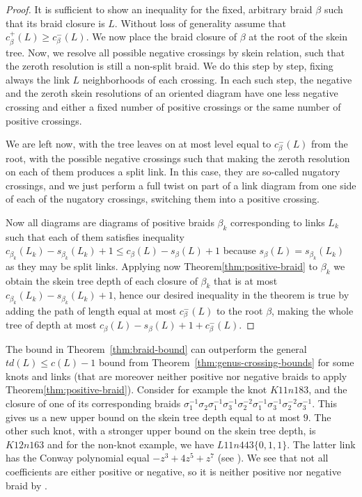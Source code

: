 \documentclass[pdftex, a4paper, 12pt, oneside]{amsart}
\numberwithin{equation}{section}
\theoremstyle{plain}
\theoremstyle{definition}
\begin{document}
	\begin{proof}
It is sufficient to show an inequality for the fixed, arbitrary braid $\beta$ such that its braid closure is $L$. Without loss of generality assume that $c_{\beta}^+(L) \geq c_{\beta}^-(L)$. We now place the braid closure of $\beta$ at the root of the skein tree. Now, we resolve all possible negative crossings by skein relation, such that the zeroth resolution is still a non-split braid. We do this step by step, fixing always the link $L$ neighborhoods of each crossing. In each such step, the negative and the zeroth skein resolutions of an oriented diagram have one less negative crossing and either a fixed number of positive crossings or the same number of positive crossings.
\par
We are left now, with the tree leaves on at most level equal to $c_{\beta}^-(L)$ from the root, with the possible negative crossings such that making the zeroth resolution on each of them produces a split link. In this case, they are so-called nugatory crossings, and we just perform a full twist on part of a link diagram from one side of each of the nugatory crossings, switching them into a positive crossing.
\par
Now all diagrams are diagrams of positive braids $\beta_{k}$ corresponding to links $L_{k}$ such that each of them satisfies inequality $c_{\beta_{k}}(L_{k})-s_{\beta_{k}}(L_{k})+1 \leq c_{\beta}(L)-s_{\beta}(L)+1$ because $s_{\beta}(L)=s_{\beta_{k}}(L_{k})$ as they may be split links. Applying now Theorem\;\ref{thm:positive-braid} to $\beta_{k}$ we obtain the skein tree depth of each closure of $\beta_{k}$ that is at most $c_{\beta_{k}}(L_{k})-s_{\beta_{k}}(L_{k})+1$, hence our desired inequality in the theorem is true by adding the path of length equal at most $c_{\beta}^-(L)$ to the root $\beta$, making the whole tree of depth at most $c_{\beta}(L)-s_{\beta}(L)+1+c_{\beta}^-(L)$.
	\end{proof}
	
	The bound in Theorem~\ref{thm:braid-bound} can outperform the general $td(L)\le c(L)-1$ bound from Theorem~\ref{thm:genus-crossing-bounds} for some knots and links (that are moreover neither positive nor negative braids to apply Theorem\;\ref{thm:positive-braid}). Consider for example the knot $K11n183$, and the closure of one of its corresponding braids $\sigma_1^{-1}\sigma_2\sigma_1^{-1}\sigma_3^{-1}\sigma_2^{-2} \sigma_1^{-1}\sigma_3^{-1}\sigma_2^{-2}\sigma_3^{-1}$. This gives us a new upper bound on the skein tree depth equal to at most $9$. The other such knot, with a stronger upper bound on the skein tree depth, is $K12n163$ and for the non-knot example, we have $L11n443\{0,1,1\}$. The latter link has the Conway polynomial equal $-z^3+4z^5+z^7$ (see \cite{LivMoo23}). We see that not all coefficients are either positive or negative, so it is neither positive nor negative braid by \cite{Cro89}.
	
\end{document}
